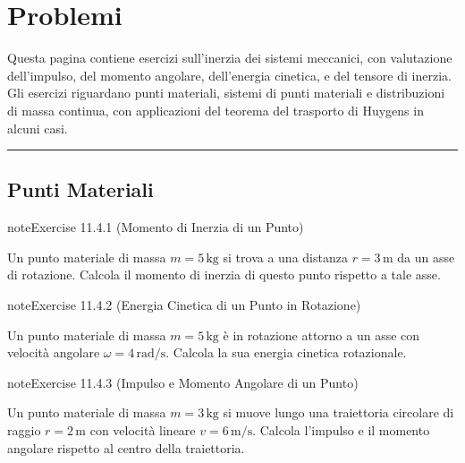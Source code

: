 \documentclass[letterpaper,10pt,italian]{jupyterBook}
\begin{document}
\sphinxstepscope


\section{Problemi}
\label{\detokenize{ch/mechanics/inertia-problems:problemi}}\label{\detokenize{ch/mechanics/inertia-problems::doc}}
\sphinxAtStartPar
Questa pagina contiene esercizi sull’inerzia dei sistemi meccanici, con valutazione dell’impulso, del momento angolare, dell’energia cinetica, e del tensore di inerzia. Gli esercizi riguardano punti materiali, sistemi di punti materiali e distribuzioni di massa continua, con applicazioni del teorema del trasporto di Huygens in alcuni casi.


\bigskip\hrule\bigskip



\subsection{Punti Materiali}
\label{\detokenize{ch/mechanics/inertia-problems:punti-materiali}} \label{exercise:ch/mechanics/inertia-problems-exercise-0}

\begin{sphinxadmonition}{note}{Exercise 11.4.1 (Momento di Inerzia di un Punto)}



\sphinxAtStartPar
Un punto materiale di massa \(m = 5 \, \text{kg}\) si trova a una distanza \(r = 3 \, \text{m}\) da un asse di rotazione. Calcola il momento di inerzia di questo punto rispetto a tale asse.
\end{sphinxadmonition}
 \label{exercise:ch/mechanics/inertia-problems-exercise-1}

\begin{sphinxadmonition}{note}{Exercise 11.4.2 (Energia Cinetica di un Punto in Rotazione)}



\sphinxAtStartPar
Un punto materiale di massa \(m = 5 \, \text{kg}\) è in rotazione attorno a un asse con velocità angolare \(\omega = 4 \, \text{rad/s}\). Calcola la sua energia cinetica rotazionale.
\end{sphinxadmonition}
 \label{exercise:ch/mechanics/inertia-problems-exercise-2}

\begin{sphinxadmonition}{note}{Exercise 11.4.3 (Impulso e Momento Angolare di un Punto)}



\sphinxAtStartPar
Un punto materiale di massa \(m = 3 \, \text{kg}\) si muove lungo una traiettoria circolare di raggio \(r = 2 \, \text{m}\) con velocità lineare \(v = 6 \, \text{m/s}\). Calcola l’impulso e il momento angolare rispetto al centro della traiettoria.
\end{sphinxadmonition}
 \label{exercise:ch/mechanics/inertia-problems-exercise-3}
\end{document}
